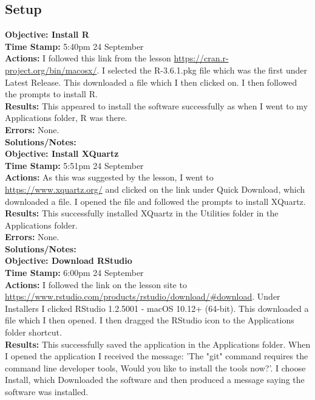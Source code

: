 \documentclass{article}
\begin{document}
\begin{FlushLeft}
\subsection{Setup}
\textbf{Objective: Install R}\\ 
\textbf{Time Stamp:} 5:40pm 24 September\\
\textbf{Actions:} I followed this link from the lesson \url{https://cran.r-project.org/bin/macosx/}. I selected the R-3.6.1.pkg file which was the first under Latest Release. This downloaded a file which I then clicked on. I then followed the prompts to install R.\\
\textbf{Results:} This appeared to install the software successfully as when I went to my Applications folder, R was there.\\
\textbf{Errors:} None.\\
\textbf{Solutions/Notes:} \\
\vspace{5mm}
\textbf{Objective: Install XQuartz}\\ 
\textbf{Time Stamp:} 5:51pm 24 September\\
\textbf{Actions:} As this was suggested by the lesson, I went to \url{https://www.xquartz.org/} and clicked on the link under Quick Download, which downloaded a file. I opened the file and followed the prompts to install XQuartz.\\
\textbf{Results:} This successfully installed XQuartz in the Utilities folder in the Applications folder.\\
\textbf{Errors:} None.\\
\textbf{Solutions/Notes:}\\
\vspace{5mm}
\textbf{Objective: Download RStudio}\\ 
\textbf{Time Stamp:} 6:00pm 24 September \\
\textbf{Actions:} I followed the link on the lesson site to \url{https://www.rstudio.com/products/rstudio/download/#download}. Under Installers I clicked RStudio 1.2.5001 - macOS 10.12+ (64-bit). This downloaded a file which I then opened. I then dragged the RStudio icon to the Applications folder shortcut.\\
\textbf{Results:} This successfully saved the application in the Applications folder. When I opened the application I received the message: 'The "git" command requires the command line developer tools, Would you like to install the tools now?'. I choose Install, which Downloaded the software and then produced a message saying the software was installed. \\

\end{FlushLeft}
\end{document}
